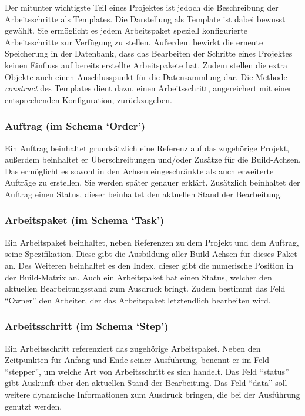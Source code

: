 Der mitunter wichtigste Teil eines Projektes ist jedoch die Beschreibung der Arbeitsschritte als Templates.
Die Darstellung als Template ist dabei bewusst gewählt.
Sie ermöglicht es jedem Arbeitspaket speziell konfigurierte Arbeitsschritte zur Verfügung zu stellen.
Außerdem bewirkt die erneute Speicherung in der Datenbank,
dass das Bearbeiten der Schritte eines Projektes keinen Einfluss auf bereits erstellte Arbeitspakete hat.
Zudem stellen die extra Objekte auch einen Anschlusspunkt für die Datensammlung dar.
Die Methode \textit{construct} des Templates dient dazu,
einen Arbeitsschritt, angereichert mit einer entsprechenden Konfiguration, zurückzugeben.

\subsubsection{Auftrag (im Schema `Order')}

Ein Auftrag beinhaltet grundsätzlich eine Referenz auf das zugehörige Projekt,
außerdem beinhaltet er Überschreibungen und/oder Zusätze für die Build-Achsen.
Das ermöglicht es sowohl in den Achsen eingeschränkte
als auch erweiterte Aufträge zu erstellen.
Sie werden später genauer erklärt.
Zusätzlich beinhaltet der Auftrag einen Status, dieser beinhaltet den aktuellen Stand der Bearbeitung.

\subsubsection{Arbeitspaket (im Schema `Task')}
Ein Arbeitspaket beinhaltet, neben Referenzen zu dem Projekt und dem Auftrag,
seine Spezifikation. Diese gibt die Ausbildung aller Build-Achsen für dieses Paket an.
Des Weiteren beinhaltet es den Index, dieser gibt die numerische Position in der Build-Matrix an.
Auch ein Arbeitspaket hat einen Status, welcher den aktuellen Bearbeitungsstand zum Ausdruck bringt.
Zudem bestimmt das Feld ``Owner'' den Arbeiter, der das Arbeitspaket letztendlich bearbeiten wird.

\subsubsection{Arbeitsschritt (im Schema `Step')}

Ein Arbeitsschritt referenziert das zugehörige Arbeitspaket.
Neben den Zeitpunkten für Anfang und Ende seiner Ausführung,
benennt er im Feld ``stepper'', um welche Art von Arbeitsschritt es sich handelt.
Das Feld ``status'' gibt Auskunft über den aktuellen Stand der Bearbeitung.
Das Feld ``data'' soll weitere dynamische Informationen zum Ausdruck bringen,
die bei der Ausführung genutzt werden.

